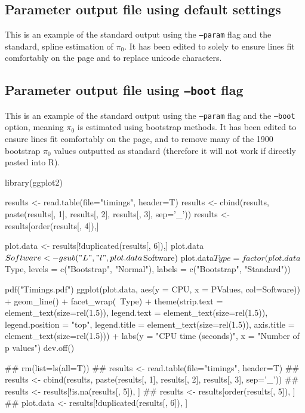 \documentclass{amsart}
\begin{document}
\subsection{Parameter output file using default settings}
\label{sec:suppspline}
This is an example of the standard output using the \texttt{--param} flag and the standard, spline estimation of $\pi_0$. It has been edited to solely to ensure lines fit comfortably on the page and to replace unicode characters.



\subsection{Parameter output file using \texttt{--boot} flag}
\label{sec:suppboot}
This is an example of the standard output using the \texttt{--param} flag and the \texttt{--boot} option, meaning $\pi_0$ is estimated using bootstrap methods. It has been edited to ensure lines fit comfortably on the page, and to remove many of the 1900 bootstrap $\pi_0$ values outputted as standard (therefore it will not work if directly pasted into R).


\iffalse
library(ggplot2)

results <- read.table(file="timings", header=T)
results <- cbind(results, paste(results[, 1], results[, 2], results[, 3], sep='_'))
results <- results[order(results[, 4]),]

plot.data <- results[!duplicated(results[, 6]),]
plot.data$Software <- gsub("L", "l", plot.data$Software)
plot.data$Type = factor(plot.data$Type, levels = c("Bootstrap", "Normal"), labels = c("Bootstrap", "Standard"))

pdf("Timings.pdf")
ggplot(plot.data, aes(y = CPU, x = PValues, col=Software)) + geom_line() +
          facet_wrap(~Type) +
          theme(strip.text = element_text(size=rel(1.5)), legend.text = element_text(size=rel(1.5)),
                legend.position = "top", legend.title = element_text(size=rel(1.5)),
                axis.title = element_text(size=rel(1.5))) +
          labs(y = "CPU time (seconds)", x = "Number of p values")
dev.off()

## rm(list=ls(all=T))
## results <- read.table(file="timings", header=T)
## results <- cbind(results, paste(results[, 1], results[, 2], results[, 3], sep='_'))
## results <- results[!is.na(results[, 5]), ]
## results <- results[order(results[, 5]), ]
## plot.data <- results[!duplicated(results[, 6]), ]
\end{document}
